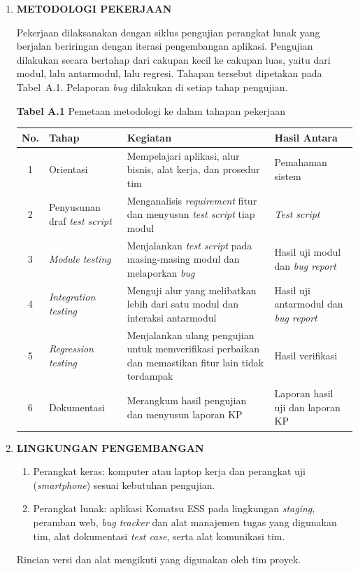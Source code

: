 \begin{framed}
\begin{enumerate}[label=\arabic*.,leftmargin=1.2cm,itemsep=6pt]
\item \textbf{METODOLOGI PEKERJAAN}

Pekerjaan dilaksanakan dengan siklus pengujian perangkat lunak yang berjalan beriringan dengan iterasi pengembangan aplikasi. Pengujian dilakukan secara bertahap dari cakupan kecil ke cakupan luas, yaitu dari modul, lalu antarmodul, lalu regresi. Tahapan tersebut dipetakan pada Tabel~A.1. Pelaporan \textit{bug} dilakukan di setiap tahap pengujian.

\begin{center}
\textbf{Tabel A.1} Pemetaan metodologi ke dalam tahapan pekerjaan\\[4pt]
\small
\begin{tabularx}{\linewidth}{|c|p{2.9cm}|X|p{2.6cm}|}
\hline
\textbf{No.} & \textbf{Tahap} & \textbf{Kegiatan} & \textbf{Hasil Antara} \\
\hline
1 & Orientasi & Mempelajari aplikasi, alur bisnis, alat kerja, dan prosedur tim & Pemahaman sistem \\
\hline
2 & Penyusunan draf \textit{test script} & Menganalisis \textit{requirement} fitur dan menyusun \textit{test script} tiap modul & \textit{Test script} \\
\hline
3 & \textit{Module testing} & Menjalankan \textit{test script} pada masing-masing modul dan melaporkan \textit{bug} & Hasil uji modul dan \textit{bug report} \\
\hline
4 & \textit{Integration testing} & Menguji alur yang melibatkan lebih dari satu modul dan interaksi antarmodul & Hasil uji antarmodul dan \textit{bug report} \\
\hline
5 & \textit{Regression testing} & Menjalankan ulang pengujian untuk memverifikasi perbaikan dan memastikan fitur lain tidak terdampak & Hasil verifikasi \\
\hline
6 & Dokumentasi & Merangkum hasil pengujian dan menyusun laporan KP & Laporan hasil uji dan laporan KP \\
\hline
\end{tabularx}
\end{center}

\item \textbf{LINGKUNGAN PENGEMBANGAN}

\begin{enumerate}[label=\arabic*)]
\item Perangkat keras: komputer atau laptop kerja dan perangkat uji (\textit{smartphone}) sesuai kebutuhan pengujian.
\item Perangkat lunak: aplikasi Komatsu ESS pada lingkungan \textit{staging}, peramban web, \textit{bug tracker} dan alat manajemen tugas yang digunakan tim, alat dokumentasi \textit{test case}, serta alat komunikasi tim.
\end{enumerate}
Rincian versi dan alat mengikuti yang digunakan oleh tim proyek.


\end{enumerate}
\end{framed}
